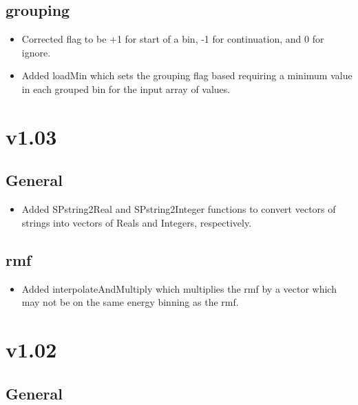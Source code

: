 \documentclass[11pt]{book}
\begin{document}
\subsection{grouping}

\begin{itemize}

\item Corrected flag to be +1 for start of a bin, -1 for continuation,
  and 0 for ignore.

\item Added loadMin which sets the grouping flag based requiring a
  minimum value in each grouped bin for the input array of values.

\end{itemize}

\section{v1.03}

\subsection{General}

\begin{itemize}

\item Added SPstring2Real and SPstring2Integer functions to convert
  vectors of strings into vectors of Reals and Integers, respectively.

\end{itemize}

\subsection{rmf}

\begin{itemize}

\item Added interpolateAndMultiply which multiplies the rmf by a
  vector which may not be on the same energy binning as the rmf.

\end{itemize}

\section{v1.02}

\subsection{General}
\end{document}
